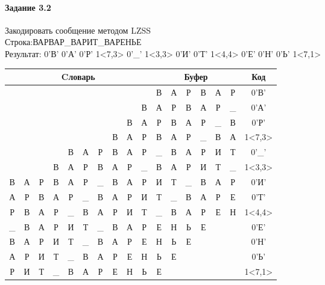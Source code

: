 \documentclass[a4paper, 12pt]{article}
\begin{document}
\paragraph{Задание 3.2}

Закодировать сообщение методом LZSS\\
Строка:ВАРВАР\_ВАРИТ\_ВАРЕНЬЕ\\
Результат: 0'В' 0'А' 0'Р' 1<7,3> 0'\_' 1<3,3> 0'И' 0'Т' 1<4,4> 0'Е' 0'Н' 0'Ь' 1<7,1>\\
\begin{table}[h!]
\centering
\begin{tabular}{|c|c|c|c|c|c|c|c|c|c|c|c|c|c|c|c|c|}
\hline
\multicolumn{10}{|c|}{Cловарь} & \multicolumn{6}{c|}{Буфер} & Код  \\ \hline
  &   &   &   &   &   &   &   &   &   & В & А & Р & В & А & Р & 0'В'\\ \hline
  &   &   &   &   &   &   &   &   & В & А & Р & В & А & Р & \_ & 0'А'\\ \hline
  &   &   &   &   &   &   &   & В & А & Р & В & А & Р & \_ & В & 0'Р'\\ \hline
  &   &   &   &   &   &   & \cellcolor[HTML]{FFFF00} В & \cellcolor[HTML]{FFFF00} А & \cellcolor[HTML]{FFFF00} Р & \cellcolor[HTML]{FFFF00} В & \cellcolor[HTML]{FFFF00} А & \cellcolor[HTML]{FFFF00} Р & \_ & В & А & 1<7,3>\\ \hline
  &   &   &   & В & А & Р & В & А & Р & \_ & В & А & Р & И & Т & 0'\_'\\ \hline
  &   &   & \cellcolor[HTML]{FFFF00} В & \cellcolor[HTML]{FFFF00} А & \cellcolor[HTML]{FFFF00} Р & В & А & Р & \_ & \cellcolor[HTML]{FFFF00} В & \cellcolor[HTML]{FFFF00} А & \cellcolor[HTML]{FFFF00} Р & И & Т & \_ & 1<3,3>\\ \hline
В & А & Р & В & А & Р & \_ & В & А & Р & И & Т & \_ & В & А & Р & 0'И'\\ \hline
А & Р & В & А & Р & \_ & В & А & Р & И & Т & \_ & В & А & Р & Е & 0'Т'\\ \hline
Р & В & А & Р & \cellcolor[HTML]{FFFF00} \_ & \cellcolor[HTML]{FFFF00} В & \cellcolor[HTML]{FFFF00} А & \cellcolor[HTML]{FFFF00} Р & И & Т & \cellcolor[HTML]{FFFF00} \_ & \cellcolor[HTML]{FFFF00} В & \cellcolor[HTML]{FFFF00} А & \cellcolor[HTML]{FFFF00} Р & Е & Н & 1<4,4>\\ \hline
\_ & В & А & Р & И & Т & \_ & В & А & Р & Е & Н & Ь & Е &   &   & 0'Е'\\ \hline
В & А & Р & И & Т & \_ & В & А & Р & Е & Н & Ь & Е &   &   &   & 0'Н'\\ \hline
А & Р & И & Т & \_ & В & А & Р & Е & Н & Ь & Е &   &   &   &   & 0'Ь'\\ \hline
Р & И & Т & \_ & В & А & Р & \cellcolor[HTML]{FFFF00} Е & Н & Ь & \cellcolor[HTML]{FFFF00} Е &   &   &   &   &   & 1<7,1>\\ \hline
\end{tabular}
\end{table}
\end{document}
